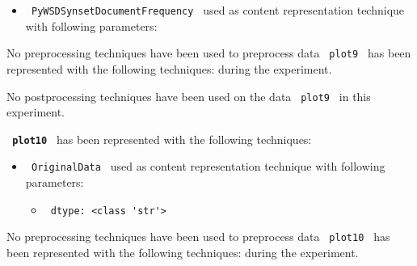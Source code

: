 \documentclass[11pt]{article}
\begin{document}
\begin{itemize}
                                                            
            \item
        \verb| PyWSDSynsetDocumentFrequency | used as content representation technique with following parameters:
        \begin{itemize}
                    \end{itemize}
    \end{itemize}
\hfill\break
\hfill\break



No preprocessing techniques have been used to preprocess data \lstinline[style=verbatim-text]| plot9 | has been represented with the following techniques:
 during the experiment.
\hfill\break
\hfill\break



No postprocessing techniques have been used on the data \lstinline[style=verbatim-text]| plot9 | in this experiment.
\hfill\break
\hfill\break



\textbf{\lstinline[style=verbatim-text]| plot10 |} has been represented with the following techniques:
\hfill\break
\hfill\break

\begin{itemize}
                                                            
            \item
        \verb| OriginalData | used as content representation technique with following parameters:
        \begin{itemize}
                            \item
                \verb| dtype: <class 'str'>|
                    \end{itemize}
    \end{itemize}
\hfill\break
\hfill\break



No preprocessing techniques have been used to preprocess data \lstinline[style=verbatim-text]| plot10 | has been represented with the following techniques:
 during the experiment.
\hfill\break
\hfill\break
\end{document}

